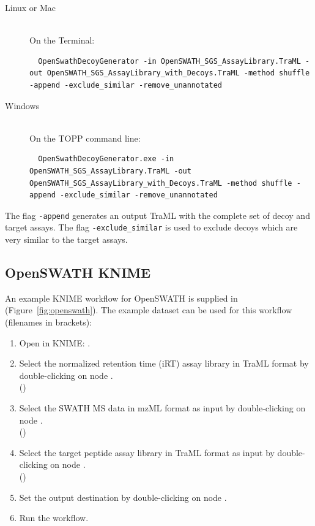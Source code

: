 \begin{description}
  \item[Linux or Mac] \hfill \\
    On the Terminal:
    \begin{lstlisting}
  OpenSwathDecoyGenerator -in OpenSWATH_SGS_AssayLibrary.TraML -out OpenSWATH_SGS_AssayLibrary_with_Decoys.TraML -method shuffle -append -exclude_similar -remove_unannotated
  \end{lstlisting}
  \item[Windows] \hfill \\
    On the TOPP command line:
    \begin{lstlisting}
  OpenSwathDecoyGenerator.exe -in OpenSWATH_SGS_AssayLibrary.TraML -out OpenSWATH_SGS_AssayLibrary_with_Decoys.TraML -method shuffle -append -exclude_similar -remove_unannotated
  \end{lstlisting}
\end{description}

The flag \texttt{-append} generates an output TraML with the complete set of decoy and target assays. The flag \texttt{-exclude\_similar} is used to exclude decoys which are very similar to the target assays.  

\subsection{OpenSWATH KNIME}
An example KNIME workflow for OpenSWATH is supplied in  (Figure~\ref{fig:openswath}). The example dataset can be used for this workflow (filenames in brackets):

\begin{enumerate}
  \item Open  in KNIME: .
  \item Select the normalized retention time (iRT) assay library in TraML format by double-clicking on node .\\
  ()
  \item Select the SWATH MS data in mzML format as input by double-clicking on node .\\
  ()
  \item Select the target peptide assay library in TraML format  as input by double-clicking on node .\\
  ()
  \item Set the output destination by double-clicking on node .\\
  \item Run the workflow.
\end{enumerate}

